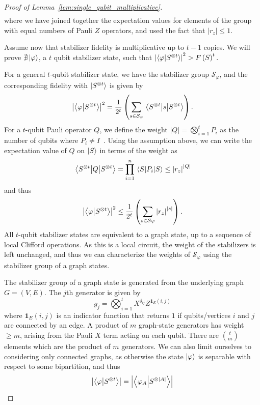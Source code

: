 \begin{proof}[Proof of Lemma~\ref{lem:single_qubit_multiplicative}]
\begin{align}
\label{eq:t_copy_fidelity}
\end{align}
where we have joined together the expectation values for elements of the group with equal numbers of Pauli $Z$ operators, and used the fact that $\left|r_{z}\right|\leq 1$.\par
Assume now that stabilizer fidelity is multiplicative up to $t-1$ copies. We will prove $\nexists \ket{\varphi}$, a $t$ qubit stabilizer state, such that $\left|\braket{\varphi}{S^{\otimes t}}\right|^{2}> F\left(S\right)^{t}.$\par
For a general $t$-qubit stabilizer state, we have the stabilizer group $\mathcal{S}_{\varphi}$, and the corresponding fidelity with $\ket{S^{\otimes t}}$ is given by
\[\left|\braket{\varphi}{S^{\otimes t}}\right|^{2} = \frac{1}{2^{t}} \left( \sum_{s\in\mathcal{S}_{\varphi}}\matrixel{S^{\otimes t}}{s}{S^{\otimes t}} \right).\]
For a $t$-qubit Pauli operator $Q$, we define the weight $\left|Q\right|=\bigotimes_{i=1}^{t}P_{i}$ as the number of qubits where $P_{i}\neq I$~\cite{Gottesman1997}. Using the assumption above, we can write the expectation value of $Q$ on $\ket{S}$ in terms of the weight as
\[\matrixel{S^{\otimes t}}{Q}{S^{\otimes t}} = \prod_{i=1}^{n}\matrixel{S}{P_{i}}{S}\leq \left|r_{z}\right|^{\left|Q\right|}\]
and thus
\[
\left|\braket{\varphi}{S^{\otimes t}}\right|^{2} \leq \frac{1}{2^{t}} \left( \sum_{s\in\mathcal{S}{\varphi}} \left|r_{z}\right|^{\left|s\right|}\right).\]
All $t$-qubit stabilizer states are equivalent to a graph state, up to a sequence of local Clifford operations. As this is a local circuit, the weight of the stabilizers is left unchanged, and thus we can characterize the weights of $\mathcal{S}_{\varphi}$ using the stabilizer group of a graph states.\par
The stabilizer group of a graph state is generated from the underlying graph $G=\left(V,E\right)$. The $j$th generator is given by
\[g_{j} = \bigotimes_{i=1}^{t}X^{\delta_{ij}} Z^{\mathbf{1}_{E}\left(i,j\right)}\]
where $\mathbf{1}_{E}\left(i,j\right)$ is an indicator function that returns $1$ if qubits/vertices $i$ and $j$ are connected by an edge. A product of $m$ graph-state generators has weight $\geq m$, arising from the Pauli $X$ term acting on each qubit. There are $\binom{t}{m}$ elements which are the product of $m$ generators. We can also limit ourselves to considering only connected graphs, as otherwise the state $\ket{\varphi}$ is separable with respect to some bipartition, and thus 
\[
\left|\braket{\varphi}{S^{\otimes t}}\right|
=\left|\braket{\varphi_{A}}{S^{\otimes \left|A\right|}}\right|
\]
\end{proof}
